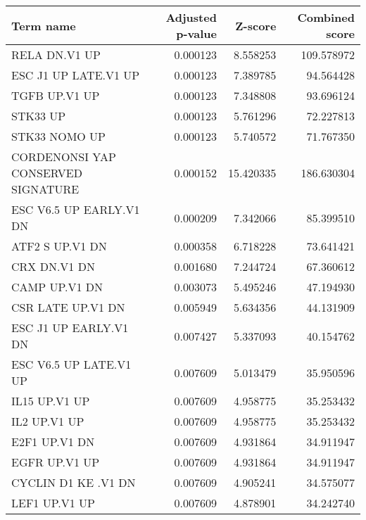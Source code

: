 \begin{tabular}{lrrr}
\toprule
                         Term name &  Adjusted p-value &   Z-score &  Combined score \\
\midrule
                     RELA DN.V1 UP &          0.000123 &  8.558253 &      109.578972 \\
              ESC J1 UP LATE.V1 UP &          0.000123 &  7.389785 &       94.564428 \\
                     TGFB UP.V1 UP &          0.000123 &  7.348808 &       93.696124 \\
                          STK33 UP &          0.000123 &  5.761296 &       72.227813 \\
                     STK33 NOMO UP &          0.000123 &  5.740572 &       71.767350 \\
CORDENONSI YAP CONSERVED SIGNATURE &          0.000152 & 15.420335 &      186.630304 \\
           ESC V6.5 UP EARLY.V1 DN &          0.000209 &  7.342066 &       85.399510 \\
                   ATF2 S UP.V1 DN &          0.000358 &  6.718228 &       73.641421 \\
                      CRX DN.V1 DN &          0.001680 &  7.244724 &       67.360612 \\
                     CAMP UP.V1 DN &          0.003073 &  5.495246 &       47.194930 \\
                 CSR LATE UP.V1 DN &          0.005949 &  5.634356 &       44.131909 \\
             ESC J1 UP EARLY.V1 DN &          0.007427 &  5.337093 &       40.154762 \\
            ESC V6.5 UP LATE.V1 UP &          0.007609 &  5.013479 &       35.950596 \\
                     IL15 UP.V1 UP &          0.007609 &  4.958775 &       35.253432 \\
                      IL2 UP.V1 UP &          0.007609 &  4.958775 &       35.253432 \\
                     E2F1 UP.V1 DN &          0.007609 &  4.931864 &       34.911947 \\
                     EGFR UP.V1 UP &          0.007609 &  4.931864 &       34.911947 \\
               CYCLIN D1 KE .V1 DN &          0.007609 &  4.905241 &       34.575077 \\
                     LEF1 UP.V1 UP &          0.007609 &  4.878901 &       34.242740 \\

\end{tabular}
